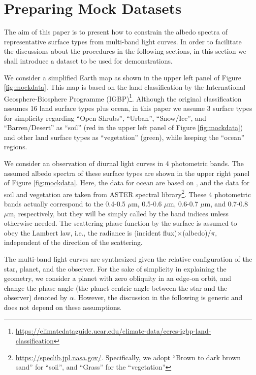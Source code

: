 \documentclass[iop,numberedappendix,apj,]{emulateapj}
\begin{document}
\section{Preparing Mock Datasets}
\label{s:mockdata}

The aim of this paper is to present how to constrain the albedo spectra of representative surface types from multi-band light curves. 
In order to facilitate the discussions about the procedures in the following sections, in this section we shall introduce a dataset to be used for demonstrations. 

We consider a simplified Earth map as shown in the upper left panel of Figure \ref{fig:mockdata}. 
This map is based on the land classification by the International Geosphere-Biosphere Programme (IGBP)\footnote{\url{https://climatedataguide.ucar.edu/climate-data/ceres-igbp-land-classification}}. 
Although the original classification assumes 16 land surface types plus ocean, in this paper we assume 3 surface types for simplicity regarding ``Open Shrubs'', ``Urban'', ``Snow/Ice'', and ``Barren/Desert'' as ``soil'' (red in the upper left panel of Figure \ref{fig:mockdata}) and other land surface types as ``vegetation'' (green), while keeping the ``ocean'' regions. 

We consider an observation of diurnal light curves in 4 photometric bands. 
The assumed albedo spectra of these surface types are shown in the upper right panel of Figure \ref{fig:mockdata}. 
Here, the data for ocean are based on \citet{Mclinden1997}, 
and the data for soil and vegetation are taken from ASTER spectral library\footnote{\url{https://speclib.jpl.nasa.gov/}. 
Specifically, we adopt  ``Brown to dark brown sand'' for ``soil'', and ``Grass'' for the ``vegetation''}. 
These 4 photometric bands actually correspond to the 0.4-0.5 $\mu $m, 0.5-0.6 $\mu $m, 0.6-0.7 $\mu $m, and 0.7-0.8 $\mu $m, respectively, but they will be simply called by the band indices unless otherwise needed. 
The scattering phase function by the surface is assumed to obey the Lambert law, i.e., the radiance is (incident flux)$\times $(albedo)/$\pi$, independent of the direction of the scattering. 

The multi-band light curves are synthesized given the relative configuration of the star, planet, and the observer.  
For the sake of simplicity in explaining the geometry, we consider a planet with zero obliquity in an edge-on orbit, and change the phase angle (the planet-centric angle between the star and the observer) denoted by $\alpha $. 
However, the discussion in the following is generic and does not depend on these assumptions. 
\end{document}
